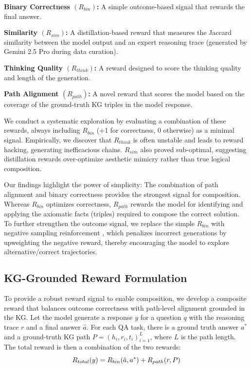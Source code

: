 \documentclass{article}
\theoremstyle{plain}
\theoremstyle{definition}
\theoremstyle{remark}
\begin{document}
\textbf{Binary Correctness $(R_{bin})$:} A simple outcome-based signal that rewards the final answer. 

\textbf{Similarity $(R_{sim})$:} A distillation-based reward that measures the Jaccard similarity between the model output and an expert reasoning trace (generated by Gemini 2.5 Pro during data curation).

\textbf{Thinking Quality $(R_{think})$:} A reward designed to score the thinking quality and length of the generation.

\textbf{Path Alignment $(R_{path})$:} A novel reward that scores the model based on the coverage of the ground-truth KG triples in the model response.

We conduct a systematic exploration by evaluating a combination of these rewards, always including $R_{bin}$ (+1 for correctness, 0 otherwise) as a minimal signal. Empirically, we discover that $R_{think}$ is often unstable and leads to reward hacking, generating inefficacious chains. $R_{sim}$ also proved sub-optimal, suggesting distillation rewards over-optimize aesthetic mimicry rather than true logical composition. 

Our findings highlight the power of simplicity: The combination of path alignment and binary correctness provides the strongest signal for composition. Whereas $R_{bin}$ optimizes correctness, $R_{path}$ rewards the model for identifying and applying the axiomatic facts (triples) required to compose the correct solution. To further strengthen the outcome signal, we replace the simple $R_{bin}$ with negative sampling reinforcement \cite{Zhu2025}, which penalizes incorrect generations by upweighting the negative reward, thereby encouraging the model to explore alternative/correct trajectories.

\subsection{KG-Grounded Reward Formulation}
\label{Reward_func}
To provide a robust reward signal to enable composition, we develop a composite reward that balances outcome correctness with path-level alignment grounded in the KG. Let the model generate a response $y$ for a question $q$ with the reasoning trace $r$ and a final answer $\hat{a}$. For each QA task, there is a ground truth answer $a^*$ and a ground-truth KG path $P = {(h_i, r_i, t_i)}_{i=1}^L$, where $L$ is the path length. The total reward is then a combination of the two rewards:
\[
\vspace{-0.5em}
R_{total}(y) = R_{bin}(\hat{a}, a^*) + R_{path}(r,P)
\vspace{-0.5em}
\]
\end{document}
